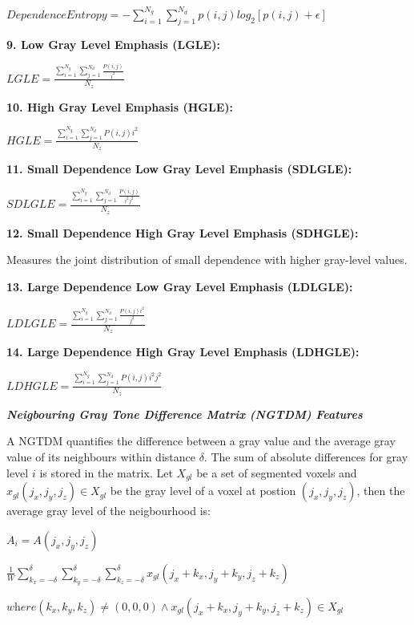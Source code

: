 $\textit{DependenceEntropy}=-\sum _{i=1}^{N_{g}}\sum _{j=1}^{N_{d}}p\left(i,j\right)log_{2}\left[p\left(i,j\right)+\epsilon \right]$

\textbf{9. Low Gray Level Emphasis (LGLE):}

$LGLE=\frac{\sum _{i=1}^{N_{g}}\sum _{j=1}^{N_{d}}\frac{P\left(i,j\right)}{i^{2}}}{N_{z}}$

\textbf{10. High Gray Level Emphasis (HGLE):}

$HGLE=\frac{\sum _{i=1}^{N_{g}}\sum _{j=1}^{N_{d}}P\left(i,j\right)i^{2}}{N_{z}}$

\textbf{11. Small Dependence Low Gray Level Emphasis (SDLGLE):}

$\textit{SDLGLE}=\frac{\sum _{i=1}^{N_{g}}\sum _{j=1}^{N_{d}}\frac{P\left(i,j\right)}{i^{2}j^{2}}}{N_{z}}$

\textbf{12. Small Dependence High Gray Level Emphasis (SDHGLE):}

Measures the joint distribution of small dependence with higher gray-level values.

\textbf{13. Large Dependence Low Gray Level Emphasis (LDLGLE):}

$\textit{LDLGLE}=\frac{\sum _{i=1}^{N_{g}}\sum _{j=1}^{N_{d}}\frac{P\left(i,j\right)i^{2}}{j^{2}}}{N_{z}}$

\textbf{14. Large Dependence High Gray Level Emphasis (LDHGLE):}

$\textit{LDHGLE}=\frac{\sum _{i=1}^{N_{g}}\sum _{j=1}^{N_{d}}P\left(i,j\right)i^{2}j^{2}}{N_{z}}$

\textbf{\textit{Neigbouring Gray Tone Difference Matrix (NGTDM) Features}}

A NGTDM quantifies the difference between a gray value and the average gray value of its neighbours within distance $\delta $. The sum of absolute differences for gray level $i$ is stored in the matrix. Let $X_{gl}$ be a set of segmented voxels and $x_{gl}\left(j_{x},j_{y},j_{z}\right)\in X_{gl}$ be the gray level of a voxel at postion $\left(j_{x},j_{y},j_{z}\right)$, then the average gray level of the neigbourhood is:

$A_{i}=A\left(j_{x},j_{y},j_{z}\right)$

$\frac{1}{W}\sum _{k_{x}=-\delta }^{\delta }\sum _{k_{y}=-\delta }^{\delta }\sum _{k_{z}=-\delta }^{\delta }x_{gl}\left(j_{x}+k_{x},j_{y}+k_{y},j_{z}+k_{z}\right)$

$\textit{where}\left(k_{x},k_{y},k_{z}\right)\neq \left(0,0,0\right)\wedge x_{gl}\left(j_{x}+k_{x},j_{y}+k_{y},j_{z}+k_{z}\right)\in X_{gl}$

